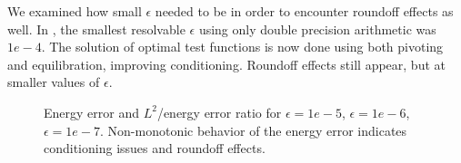 We examined how small $\epsilon$ needed to be in order to encounter roundoff effects as well. In \cite{DPGrobustness}, the smallest resolvable $\epsilon$ using only double precision arithmetic was $1e-4$. The solution of optimal test functions is now done using both pivoting and equilibration, improving conditioning. Roundoff effects still appear, but at smaller values of $\epsilon$.

\begin{figure}[h!]
\centering
{}
\caption{Energy error and $L^2$/energy error ratio for $\epsilon=1e-5$, $\epsilon=1e-6$, $\epsilon=1e-7$. Non-monotonic behavior of the energy error indicates conditioning issues and roundoff effects.}
\label{roundoff_figures}
\end{figure}

